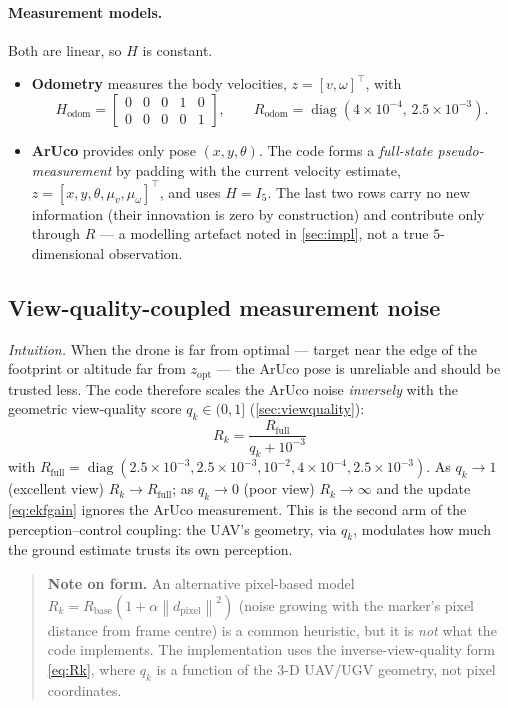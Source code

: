 \documentclass[11pt]{article}
\DeclareMathOperator{\diag}{diag}
\newcommand{\norm}[1]{\left\lVert #1 \right\rVert}
\newcommand{\opt}{\mathrm{opt}}
\begin{document}
\paragraph{Measurement models.} Both are linear, so $H$ is constant.
\begin{itemize}
\item \textbf{Odometry} measures the body velocities, $z=[v,\omega]^\top$, with
\[
H_{\text{odom}}=\begin{bmatrix}0&0&0&1&0\\0&0&0&0&1\end{bmatrix},\qquad
R_{\text{odom}}=\diag(4{\times}10^{-4},\,2.5{\times}10^{-3}).
\]
\item \textbf{ArUco} provides only pose $(x,y,\theta)$. The code forms a \emph{full-state pseudo-measurement}
by padding with the current velocity estimate, $z=[x,y,\theta,\mu_v,\mu_\omega]^\top$, and uses $H=I_5$. The
last two rows carry no new information (their innovation is zero by construction) and contribute only through
$R$ --- a modelling artefact noted in \cref{sec:impl}, not a true $5$-dimensional observation.
\end{itemize}

\subsection{View-quality-coupled measurement noise}
\emph{Intuition.} When the drone is far from optimal --- target near the edge of the footprint or altitude far
from $z_\opt$ --- the ArUco pose is unreliable and should be trusted less. The code therefore scales the ArUco
noise \emph{inversely} with the geometric view-quality score $q_k\in(0,1]$ (\cref{sec:viewquality}):
\begin{equation}
\boxed{\;R_k = \frac{R_{\text{full}}}{q_k + 10^{-3}}\;}
\label{eq:Rk}
\end{equation}
with $R_{\text{full}}=\diag(2.5{\times}10^{-3},2.5{\times}10^{-3},10^{-2},4{\times}10^{-4},2.5{\times}10^{-3})$.
As $q_k\to1$ (excellent view) $R_k\to R_{\text{full}}$; as $q_k\to0$ (poor view) $R_k\to\infty$ and the
update \cref{eq:ekfgain} ignores the ArUco measurement. This is the second arm of the perception--control
coupling: the UAV's geometry, via $q_k$, modulates how much the ground estimate trusts its own perception.

\begin{quote}\small
\textbf{Note on form.} An alternative pixel-based model $R_k=R_{\text{base}}(1+\alpha\norm{d_{\text{pixel}}}^2)$
(noise growing with the marker's pixel distance from frame centre) is a common heuristic, but it is \emph{not}
what the code implements. The implementation uses the inverse-view-quality form \cref{eq:Rk}, where $q_k$ is a
function of the $3$-D UAV/UGV geometry, not pixel coordinates.
\end{quote}
\end{document}
